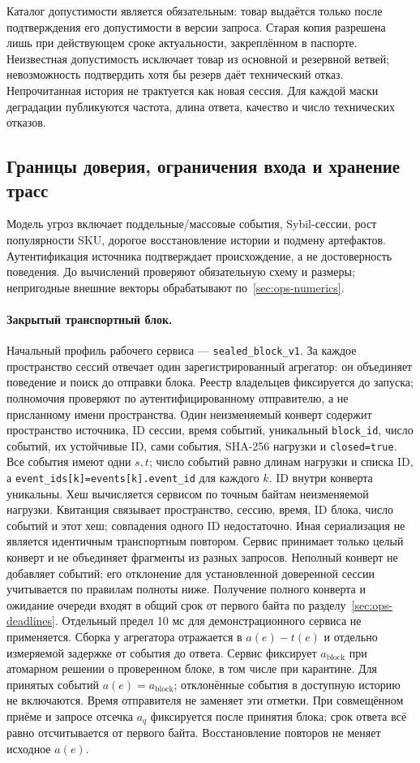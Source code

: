 \documentclass[12pt,a4paper]{article}
\newcommand{\code}[1]{{\ttfamily\small\nolinkurl{#1}}}
\theoremstyle{plainru}
\begin{document}
Каталог допустимости является обязательным: товар выдаётся только
после подтверждения его допустимости в версии запроса. Старая копия
разрешена лишь при действующем сроке актуальности, закреплённом в
паспорте. Неизвестная допустимость исключает товар из основной и
резервной ветвей; невозможность подтвердить хотя бы резерв даёт
технический отказ. Непрочитанная история не трактуется как новая сессия.
Для каждой маски деградации публикуются частота, длина ответа,
качество и число технических отказов.

\subsection{Границы доверия, ограничения входа и хранение трасс}
\label{sec:ops-security}

Модель угроз включает поддельные/массовые события, Sybil-сессии,
рост популярности SKU, дорогое восстановление истории и подмену артефактов.
Аутентификация источника подтверждает происхождение, а не достоверность
поведения. До вычислений проверяют обязательную схему и размеры;
непригодные внешние векторы обрабатывают по~\ref{sec:ops-numerics}.

\paragraph{Закрытый транспортный блок.}\label{sec:ops-transport-block}
Начальный профиль рабочего сервиса --- \code{sealed_block_v1}.
За каждое пространство сессий отвечает один зарегистрированный
агрегатор: он объединяет поведение и поиск до отправки блока.
Реестр владельцев фиксируется до запуска; полномочия проверяют по
аутентифицированному отправителю, а не присланному имени пространства.
Один неизменяемый конверт содержит пространство источника, ID сессии,
время событий, уникальный \code{block_id}, число событий, их устойчивые
ID, сами события, SHA-256 нагрузки и \code{closed=true}.
Все события имеют одни $s,t$; число событий равно длинам нагрузки
и списка ID, а \code{event_ids[k]=events[k].event_id} для каждого $k$.
ID внутри конверта уникальны. Хеш вычисляется сервисом по точным байтам неизменяемой
нагрузки. Квитанция связывает пространство, сессию, время, ID блока,
число событий и этот хеш; совпадения одного ID недостаточно.
Иная сериализация не является идентичным транспортным повтором.
Сервис принимает только целый конверт и не объединяет фрагменты
из разных запросов. Неполный конверт не добавляет событий;
его отклонение для установленной доверенной сессии учитывается
по правилам полноты ниже.
Получение полного конверта и ожидание очереди входят в общий срок от первого
байта по разделу~\ref{sec:ops-deadlines}. Отдельный предел 10 мс
для демонстрационного сервиса не применяется. Сборка у агрегатора отражается
в $a(e)-t(e)$ и отдельно измеряемой задержке от события до ответа.
Сервис фиксирует $a_{\mathrm{block}}$ при атомарном решении о проверенном
блоке, в том числе при карантине. Для принятых событий $a(e)=a_{\mathrm{block}}$;
отклонённые события в доступную историю не включаются.
Время отправителя не заменяет эти отметки.
При совмещённом приёме и запросе отсечка $a_q$
фиксируется после принятия блока; срок ответа всё равно отсчитывается
от первого байта. Восстановление повторов не меняет исходное $a(e)$.
\end{document}

